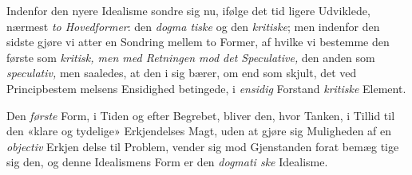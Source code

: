 Indenfor den nyere Idealisme sondre sig nu, ifølge det tid\-%
ligere Udviklede, nærmest \emph{to Hovedformer}: den \emph{dogma\-%
tiske} og den \emph{kritiske}; men indenfor den sidste gjøre vi
atter en Sondring mellem to Former, af hvilke vi bestemme
den første som \emph{kritisk, men med Retningen mod det
Speculative,} den anden som \emph{speculativ,} men saaledes, at
den i sig bærer, om end som skjult, det ved Principbestem\-%
melsens Ensidighed betingede, i \emph{ensidig} Forstand \emph{kritiske}
Element.

Den \emph{første} Form, i Tiden og efter Begrebet, bliver den,
hvor Tanken, i Tillid til den «klare og tydelige» Erkjendelses
Magt, uden at gjøre sig Muligheden af en \emph{objectiv} Erkjen\-%
delse til Problem, vender sig mod Gjenstanden forat bemæg\-%
tige sig den, og denne Idealismens Form er den \emph{dogmati\-%
ske} Idealisme.

\divrule

